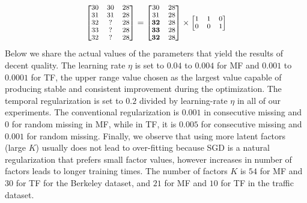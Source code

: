 \begin{equation}
\small
\label{temporalSplit_matrix}
\begin{bmatrix}
30 & 30 & 28\\
31 & 31 & 28\\
32 &  ? & 28\\
33 &  ? & 28\\
32 &  ? & 28\\
\end{bmatrix} 
= 
\begin{bmatrix}
30 & 28\\
31 & 28\\
\mathbf{32} & 28\\
\mathbf{33} & 28\\
\mathbf{32} & 28\\
\end{bmatrix} 
\times
\begin{bmatrix}
1 & 1 & 0\\
0 & 0 & 1\\
\end{bmatrix} 
\end{equation}
Below we share the actual values of the parameters that yield the results of decent quality.
The learning rate $\eta$ is set to $0.04$ to $0.004$ for MF and $0.001$ to $0.0001$ for TF, the upper range value chosen as the largest value capable of producing stable and consistent improvement during the optimization.
The temporal regularization is set to $0.2$ divided by learning-rate $\eta$ in all of our experiments.
The conventional regularization is $0.001$ in consecutive missing and $0$ for random missing in MF, while in TF, it is $0.005$ for consecutive missing and $0.001$ for random missing.
Finally, we observe that using more latent factors (large $K$) usually does not lead to over-fitting because SGD is a natural regularization that prefers small factor values, however increases in number of factors leads to longer training times.
The number of factors $K$ is $54$ for MF and $30$ for TF for the Berkeley dataset, and $21$ for MF and $10$ for TF in the traffic dataset. 

